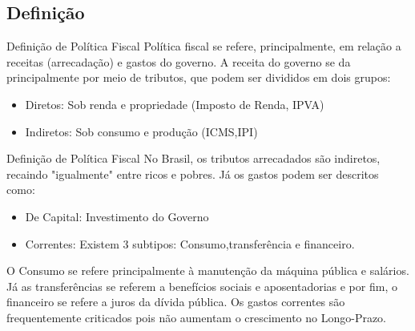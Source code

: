 \documentclass[xcolor=dvipsnames]{beamer}
\begin{document}
\subsection{Definição}
\begin{frame}{Definição de Política Fiscal}
Política fiscal se refere, principalmente, em relação a receitas (arrecadação) e gastos do governo. A receita do governo se da principalmente por meio de tributos, que podem ser divididos em dois grupos: 

\begin{itemize}
    \item Diretos: Sob renda e propriedade (Imposto de Renda, IPVA)
    \item Indiretos: Sob consumo e produção (ICMS,IPI)
\end{itemize}
\end{frame}
\begin{frame}{Definição de Política Fiscal}
No Brasil, os tributos arrecadados são indiretos, recaindo "igualmente" entre ricos e pobres.
Já os gastos podem ser descritos como: 
\begin{itemize}
    \item De Capital: Investimento do Governo 
    \item Correntes: Existem 3 subtipos: Consumo,transferência e financeiro. 
\end{itemize}
O Consumo se refere principalmente à manutenção da máquina pública e salários. Já as transferências se referem a benefícios sociais e aposentadorias e por fim, o financeiro se refere a juros da dívida pública. 
Os gastos correntes são frequentemente criticados pois não aumentam o crescimento no Longo-Prazo.
\end{frame}
\end{document}
